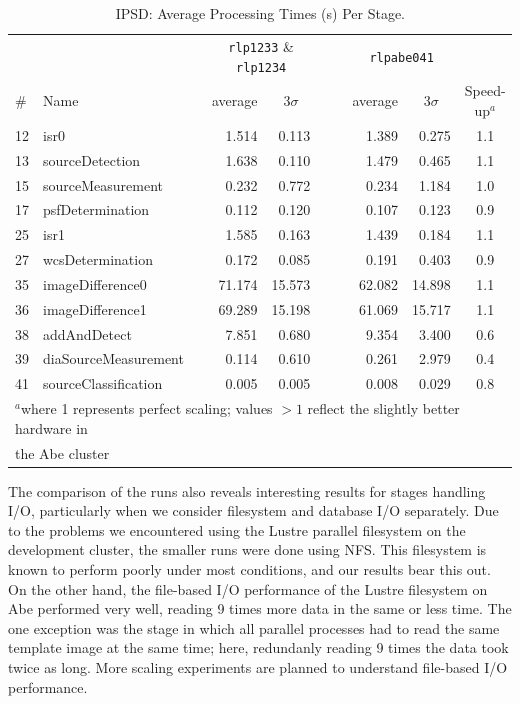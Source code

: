 \begin{table}[htbp]
\begin{center}
\caption{IPSD: Average Processing Times (s) Per Stage. 
\label{ex:tbl:allscislices}}
\vspace{\baselineskip}
\begin{tabular}{llcrrc|crr|c}
\hline\hline
   &      && \multicolumn{2}{c}{{\tt rlp1233} \& {\tt rlp1234}} 
         &&& \multicolumn{2}{c|}{{\tt rlpabe041}} & \\
\# & Name && \multicolumn{1}{c}{average}&\multicolumn{1}{c}{$3\sigma$} 
         &&& \multicolumn{1}{c}{average}&\multicolumn{1}{c|}{$3\sigma$} 
   & Speed-up$^a$ \\ 
\hline
12 &                 isr0 &&  1.514 &  0.113 &&&  1.389 &  0.275 & 1.1 \\  %
13 &      sourceDetection &&  1.638 &  0.110 &&&  1.479 &  0.465 & 1.1 \\  %
15 &    sourceMeasurement &&  0.232 &  0.772 &&&  0.234 &  1.184 & 1.0 \\  %
17 &     psfDetermination &&  0.112 &  0.120 &&&  0.107 &  0.123 & 0.9 \\  %
25 &                 isr1 &&  1.585 &  0.163 &&&  1.439 &  0.184 & 1.1 \\  %
27 &     wcsDetermination &&  0.172 &  0.085 &&&  0.191 &  0.403 & 0.9 \\  %
35 &     imageDifference0 && 71.174 & 15.573 &&& 62.082 & 14.898 & 1.1 \\  %
36 &     imageDifference1 && 69.289 & 15.198 &&& 61.069 & 15.717 & 1.1 \\  %
38 &         addAndDetect &&  7.851 &  0.680 &&&  9.354 &  3.400 & 0.6 \\  %
39 & diaSourceMeasurement &&  0.114 &  0.610 &&&  0.261 &  2.979 & 0.4 \\  %
41 & sourceClassification &&  0.005 &  0.005 &&&  0.008 &  0.029 & 0.8 \\  %
\hline
\multicolumn{10}{l}{$^a$where 1 represents perfect scaling; values $> 1$ reflect the slightly better hardware in}  \\ 
\multicolumn{10}{l}{\phantom{$^a$}the Abe cluster}  \\ 
\end{tabular}
\end{center}
\end{table}

The comparison of the runs also reveals interesting results for stages
handling I/O, particularly when we consider filesystem and database
I/O separately.  Due to the problems we encountered using the Lustre
parallel filesystem on the development cluster, the smaller runs were
done using NFS.  This filesystem is known to perform poorly under most
conditions, and our results bear this out.  On the other hand, the
file-based I/O performance of the Lustre filesystem on Abe performed
very well, reading 9 times more data in the same or less time.  The one
exception was the stage in which all parallel processes had to read
the same template image at the same time; here, redundanly reading 9
times the data took twice as long.  More scaling experiments are
planned to understand file-based I/O performance.  


